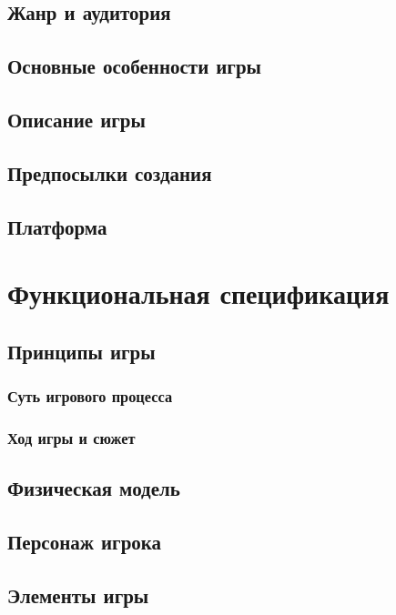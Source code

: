 \documentclass[article,12pt, fleqn]{article}
\begin{document}
\begin{itemize}
\subsection{Жанр и аудитория}

\subsection{Основные особенности игры}

\subsection{Описание игры}

\subsection{Предпосылки создания}

\subsection{Платформа}

\section{Функциональная спецификация}

\subsection{Принципы игры}

\subsubsection{Суть игрового процесса}

\subsubsection{Ход игры и сюжет}
\subsection{Физическая модель}
\subsection{Персонаж игрока}
\subsection{Элементы игры}

\end{itemize}
\end{document}
